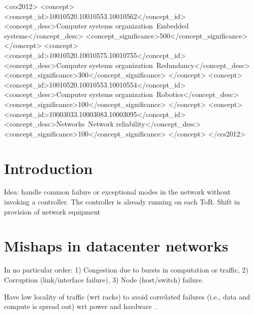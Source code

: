 \documentclass[sigconf]{acmart}
\begin{document}
%
%
\begin{CCSXML}
<ccs2012>
 <concept>
  <concept_id>10010520.10010553.10010562</concept_id>
  <concept_desc>Computer systems organization~Embedded systems</concept_desc>
  <concept_significance>500</concept_significance>
 </concept>
 <concept>
  <concept_id>10010520.10010575.10010755</concept_id>
  <concept_desc>Computer systems organization~Redundancy</concept_desc>
  <concept_significance>300</concept_significance>
 </concept>
 <concept>
  <concept_id>10010520.10010553.10010554</concept_id>
  <concept_desc>Computer systems organization~Robotics</concept_desc>
  <concept_significance>100</concept_significance>
 </concept>
 <concept>
  <concept_id>10003033.10003083.10003095</concept_id>
  <concept_desc>Networks~Network reliability</concept_desc>
  <concept_significance>100</concept_significance>
 </concept>
</ccs2012>  
\end{CCSXML}





\maketitle

\section{Introduction}
Idea: handle common failure or exceptional modes in the network without invoking a controller.
The controller is already running on each ToR.
Shift in provision of network equipment~\cite{farrington2009data}


\section{Mishaps in datacenter networks}
In no particular order:
1) Congestion due to bursts in computation or traffic,
2) Corruption (link/interface failure),
3) Node (host/switch) failure.

Have low locality of traffic (wrt racks) to avoid correlated failures (i.e., data and compute is spread out) wrt power and hardware~\cite{jupiter}.
\end{document}

